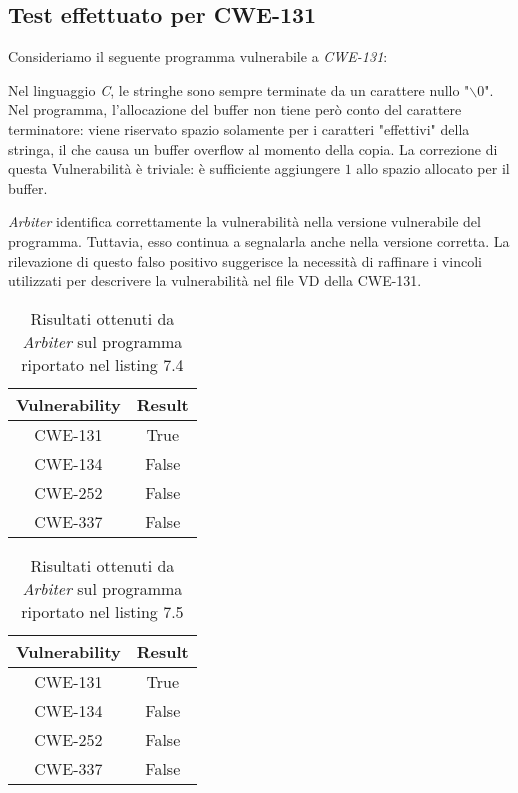 \documentclass[../main.tex]{subfiles}
\begin{document}
\subsection{Test effettuato per CWE-131}
Consideriamo il seguente programma vulnerabile a \textit{CWE-131}:

Nel linguaggio \textit{C}, le stringhe sono sempre terminate da un carattere nullo "$\backslash0$". 
Nel programma, l'allocazione del buffer non tiene però conto del carattere terminatore: viene riservato spazio
solamente per i caratteri "effettivi" della stringa, il che causa un buffer overflow al momento della copia. La correzione di questa Vulnerabilità è
triviale: è sufficiente aggiungere $1$ allo spazio allocato per il buffer.

\textit{Arbiter} identifica correttamente la vulnerabilità nella versione vulnerabile del programma. Tuttavia, esso continua a segnalarla anche nella
versione corretta. La rilevazione di questo falso positivo suggerisce la necessità di raffinare i vincoli utilizzati per descrivere
la vulnerabilità nel file VD della CWE-131. 
\begin{table}[H]
    \centering
    \begin{tabular}{|c|c|}
    \hline
    Vulnerability & Result \\ \hline
    CWE-131       & True   \\ \hline
    CWE-134       & False  \\ \hline
    CWE-252       & False  \\ \hline
    CWE-337       & False  \\ \hline
    \end{tabular}
    \caption{Risultati ottenuti da \textit{Arbiter} sul programma riportato nel listing 7.4}
\end{table}
\begin{table}[H]
    \centering
    \begin{tabular}{|c|c|}
    \hline
    Vulnerability & Result \\ \hline
    CWE-131       & True   \\ \hline
    CWE-134       & False  \\ \hline
    CWE-252       & False  \\ \hline
    CWE-337       & False  \\ \hline
    \end{tabular}
    \caption{Risultati ottenuti da \textit{Arbiter} sul programma riportato nel listing 7.5}
\end{table}
\end{document}

